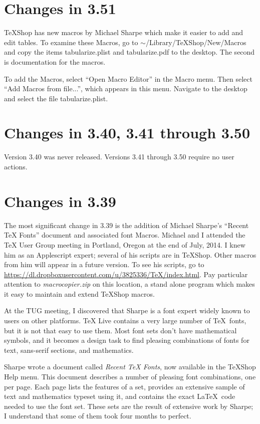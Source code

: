 \documentclass[11pt, oneside]{amsart}
\begin{document}
\section{Changes in 3.51}

TeXShop has new macros by Michael Sharpe which make it easier to add and edit tables. To
examine these Macros, go to $\sim$/Library/TeXShop/New/Macros and copy the items tabularize.plist and tabularize.pdf to the desktop. The second is documentation for the macros.

To add the Macros, select ``Open Macro Editor'' in the Macro menu. Then select ``Add Macros
from file...'', which appears in this menu. Navigate to the desktop and select the file
tabularize.plist.


\section{Changes in 3.40, 3.41 through 3.50}

Version 3.40 was never released. Versions 3.41 through 3.50 require no user actions.

\section{Changes in 3.39}

The most significant change in 3.39 is the addition of Michael Sharpe's ``Recent TeX Fonts'' document and associated font Macros.  Michael and I attended the TeX User Group meeting in Portland, Oregon at the end of July, 2014. I knew him as an Applescript expert; several of his scripts are in TeXShop. Other macros from him will appear in a future version. To see his scripts, go to 
\url{https://dl.dropboxusercontent.com/u/3825336/TeX/index.html}. Pay particular attention to 
{\em macrocopier.zip} on this location, a stand alone program which makes it easy to maintain and extend TeXShop macros.

At the TUG meeting, I discovered that Sharpe is a font expert widely known to users on other platforms.
TeX Live contains a very large number of \TeX\ fonts, but it is not that easy to use them.
Most font sets don't have mathematical symbols, and it becomes a design task to find pleasing combinations of fonts for text, sans-serif sections, and mathematics.

Sharpe wrote a document called {\em Recent TeX Fonts}, now available in the TeXShop Help menu. This document describes a number of pleasing font combinations, one per page. Each page lists the features of a set, provides an extensive sample of text and mathematics typeset using
it, and contains the exact La\TeX\ code needed to use the font set. These sets are the result
of extensive work by Sharpe; I understand that some of them took four months to perfect.
\end{document}
